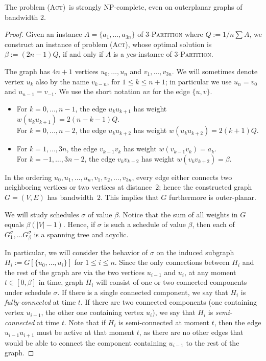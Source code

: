 \documentclass[runningheads]{llncs}
\numberwithin{equation}{section}
\newcommand{\set}[1]{\{ #1 \}}
\newcommand{\fromto}[2]{\set{#1, \ldots, #2}}
\newcommand{\act}{\textsc{(Act)}}
\newcommand{\vall}{w}
\begin{document}
\begin{theorem}
\label{thm:hardness_bandwidth}
The problem \act\ is strongly NP-complete, even on outerplanar graphs of bandwidth 2.
\end{theorem}
\begin{proof}
Given an instance $A = \fromto{a_1}{a_{3n}}$ of \textsc{3-Partition} where $Q := 1/n \sum A$, we construct an instance of problem \act, whose optimal solution is $\beta := (2n - 1)Q$, if and only if $A$ is a yes-instance of \textsc{3-Partition}.

The graph has $4n+1$ vertices $u_0,\ldots,u_n$ and $v_1,\ldots,v_{3n}$.
We will sometimes denote vertex $u_k$ also by the name $v_{k-n}$, for $1\le k\le n+1$;
in particular we use $u_n=v_0$ and $u_{n-1}=v_{-1}$. We use the short notation $uv$ for the edge $\set{u,v}$.
\begin{itemize}
\item 
For $k=0,\ldots,n-1$,   the edge $u_k u_{k+1}$ has weight $\vall(u_k u_{k+1}) = 2(n-k-1)Q$.\\
For $k=0,\ldots,n-2$,   the edge $u_k u_{k+2}$ has weight $\vall(u_k u_{k+2})=2(k+1)Q$.
\item 
For $k=1,\ldots,3n$,    the edge $v_{k-1} v_k$ has weight $\vall(v_{k-1} v_k)=a_k$.\\
For $k=-1,\ldots,3n-2$, the edge $v_k v_{k+2}$ has weight $\vall(v_k v_{k+2})=\beta$.  
\end{itemize}
In the ordering $u_0,u_1,\ldots,u_n,v_1,v_2,\ldots,v_{3n}$, every edge either connects two neighboring 
vertices or two vertices at distance~$2$; hence the constructed graph $G=(V,E)$ has bandwidth~$2$. 
This implies that $G$ furthermore is outer-planar.

We will study schedules $\sigma$ of value $\beta$. Notice that the sum of all weights in $G$ equals $\beta(|V| - 1)$. Hence, if $\sigma$ is such a schedule of value $\beta$, then each of $G^\sigma_1, \dots G^\sigma_\beta$ is a spanning tree and acyclic.

In particular, we will consider the behavior of $\sigma$ on the induced subgraph $H_i := G[\fromto{u_0}{u_i}]$ for $1\le i\le n$.
Since the only connections between $H_i$ and the rest of the graph are via the two vertices $u_{i-1}$ and $u_i$,
at any moment $t\in[0,\beta]$ in time, graph $H_i$ will consist of one or two connected components
under schedule $\sigma$.
If there is a single connected component, we say that $H_i$ is \emph{fully-connected} at time $t$.
If there are two connected components (one containing vertex $u_{i-1}$, the other one containing 
vertex $u_i$), we say that $H_i$ is \emph{semi-connected} at time $t$.
Note that if $H_i$ is semi-connected at moment $t$, then the edge $u_{i-1} u_{i+1}$ must be active at 
that moment $t$, as there are no other edges that would be able to connect the component containing 
$u_{i-1}$ to the rest of the graph.


\end{proof}
\end{document}
